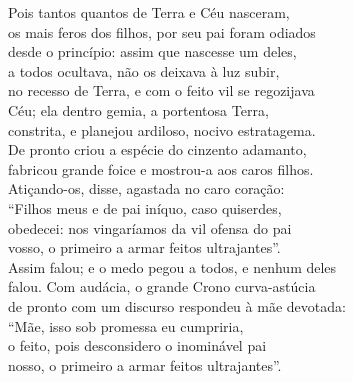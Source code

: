\begin{pages}
\begin{Rightside}
\quad{}Pois tantos quantos de Terra e Céu nasceram,\\
os mais feros dos filhos, por seu pai foram odiados \\
desde o princípio: assim que nascesse um deles,\\
a todos ocultava, não os deixava à luz subir,\\
no recesso de Terra, e com o feito vil se regozijava\\
Céu; ela dentro gemia, a portentosa Terra,\\
constrita, e planejou ardiloso, nocivo estratagema. \\
De pronto criou a espécie do cinzento adamanto,\\
fabricou grande foice e mostrou-a aos caros filhos.\\

\quad{}Atiçando-os, disse, agastada no caro coração:\\
``Filhos meus e de pai iníquo, caso quiserdes,\\
obedecei: nos vingaríamos da vil ofensa do pai \\
vosso, o primeiro a armar feitos ultrajantes''.\\

\quad{}Assim falou; e o medo pegou a todos, e nenhum deles\\
falou. Com audácia, o grande Crono curva-astúcia\\
de pronto com um discurso respondeu à mãe devotada:\\
``Mãe, isso sob promessa eu cumpriria, \\
o feito, pois desconsidero o inominável pai\\
nosso, o primeiro a armar feitos ultrajantes''.\\


\end{Rightside}
\end{pages}
